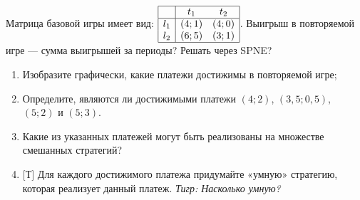 \begin{problem}
Матрица базовой игры имеет вид:  $\begin{array}{|c|cc|}  \hline {} & {t_{1} } & {t_{2} } \\  \hline {l_{1} } & {\left(4;1\right)} & {\left(4;0\right)} \\ {l_{2} } & {\left(6;5\right)} & {\left(3;1\right)} \\  \hline  \end{array}$. {\red Выигрыш в повторяемой игре — сумма выигрышей за периоды? Решать через SPNE?}
\begin{enumerate}
\item       Изобразите графически, какие платежи достижимы в повторяемой игре;

\item      Определите, являются ли достижимыми платежи  $\left(4;2\right)$,  $\left(3,5;0,5\right)$,  $\left(5;2\right)$  и  $\left(5;3\right)$.

\item       Какие из указанных платежей могут быть реализованы на множестве смешанных стратегий?

\item $[$Т$]$ Для каждого достижимого платежа придумайте «умную» стратегию, которая реализует данный платеж. {\it Тигр: Насколько умную?}
\end{enumerate}


\begin{sol}

\end{sol}
\end{problem}



